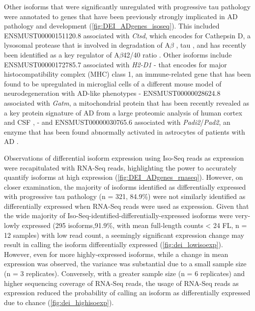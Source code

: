 Other isoforms that were significantly unregulated with progressive tau pathology were annotated to genes that have been previously strongly implicated in AD pathology and development (\cref{fig:DEI_ADgenes_isoseq}). This included ENSMUST00000151120.8 associated with \textit{Ctsd}, which encodes for Cathepsin D, a lysosomal protease that is involved in degradation of A$\beta$ \cite{JR1996}, tau \cite{A1997}, and has recently been identified as a key regulator of A$\beta$42/40 ratio \cite{Suire2020}. Other isoforms include ENSMUST00000172785.7 associated with \textit{H2-D1} - that encodes for major histocompatibility complex (MHC) class 1, an immune-related gene that has been found to be upregulated in microglial cells of a different mouse model of neurodegeneration with AD-like phenotypes \cite{Mathys2017} - ENSMUST00000028624.8 associated with \textit{Gatm}, a mitochondrial protein that has been recently revealed as a key protein signature of AD from a large proteomic analysis of human cortex and CSF \cite{Wang2020}, - and ENSMUST00000030765.6 associated with \textit{Padi2}/\textit{Pad2}, an enzyme that has been found abnormally activated in astrocytes of patients with AD \cite{A2005}.

Observations of differential isoform expression using Iso-Seq reads as expression were recapitulated with RNA-Seq reads, highlighting the power to accurately quantify isoforms at high expression (\cref{fig:DEI_ADgenes_rnaseq}).
However, on closer examination, the majority of isoforms identified as differentially expressed with progressive tau pathology (n = 321, 84.9\%) were not similarly identified as differentially expressed when RNA-Seq reads were used as expression. Given that the wide majority of Iso-Seq-identified-differentially-expressed isoforms were very-lowly expressed (295 isoforms,91.9\%, with mean full-length counts < 24 FL, n = 12 samples) with low read count, a seemingly significant expression change may result in calling the isoform differentially expressed (\cref{fig:dei_lowisoexp}). However, even for more highly-expressed isoforms, while a change in mean expression was observed, the variance was substantial due to a small sample size (n = 3 replicates). Conversely, with a greater sample size (n = 6 replicates) and higher sequencing coverage of RNA-Seq reads, the usage of RNA-Seq reads as expression reduced the probability of calling an isoform as differentially expressed due to chance (\cref{fig:dei_highisoexp}).      

